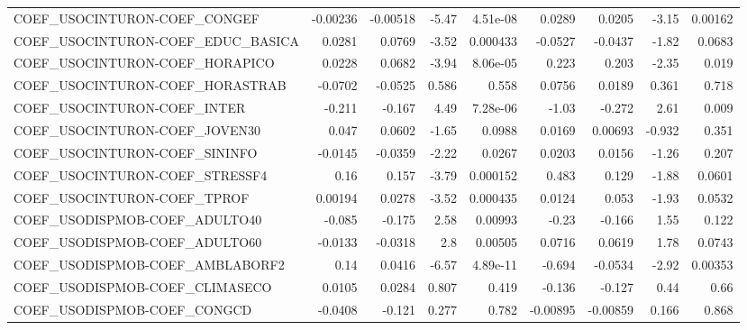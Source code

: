\begin{tabular}{lrrrrrrrr}
COEF\_USOCINTURON-COEF\_CONGEF          &    -0.00236 &     -0.00518 &    -5.47 & 4.51e-08 &     0.0289 &      0.0205 &        -3.15 &       0.00162 \\
COEF\_USOCINTURON-COEF\_EDUC\_BASICA     &      0.0281 &       0.0769 &    -3.52 & 0.000433 &    -0.0527 &     -0.0437 &        -1.82 &        0.0683 \\
COEF\_USOCINTURON-COEF\_HORAPICO        &      0.0228 &       0.0682 &    -3.94 & 8.06e-05 &      0.223 &       0.203 &        -2.35 &         0.019 \\
COEF\_USOCINTURON-COEF\_HORASTRAB       &     -0.0702 &      -0.0525 &    0.586 &    0.558 &     0.0756 &      0.0189 &        0.361 &         0.718 \\
COEF\_USOCINTURON-COEF\_INTER           &      -0.211 &       -0.167 &     4.49 & 7.28e-06 &      -1.03 &      -0.272 &         2.61 &         0.009 \\
COEF\_USOCINTURON-COEF\_JOVEN30         &       0.047 &       0.0602 &    -1.65 &   0.0988 &     0.0169 &     0.00693 &       -0.932 &         0.351 \\
COEF\_USOCINTURON-COEF\_SININFO         &     -0.0145 &      -0.0359 &    -2.22 &   0.0267 &     0.0203 &      0.0156 &        -1.26 &         0.207 \\
COEF\_USOCINTURON-COEF\_STRESSF4        &        0.16 &        0.157 &    -3.79 & 0.000152 &      0.483 &       0.129 &        -1.88 &        0.0601 \\
COEF\_USOCINTURON-COEF\_TPROF           &     0.00194 &       0.0278 &    -3.52 & 0.000435 &     0.0124 &       0.053 &        -1.93 &        0.0532 \\
COEF\_USODISPMOB-COEF\_ADULTO40         &      -0.085 &       -0.175 &     2.58 &  0.00993 &      -0.23 &      -0.166 &         1.55 &         0.122 \\
COEF\_USODISPMOB-COEF\_ADULTO60         &     -0.0133 &      -0.0318 &      2.8 &  0.00505 &     0.0716 &      0.0619 &         1.78 &        0.0743 \\
COEF\_USODISPMOB-COEF\_AMBLABORF2       &        0.14 &       0.0416 &    -6.57 & 4.89e-11 &     -0.694 &     -0.0534 &        -2.92 &       0.00353 \\
COEF\_USODISPMOB-COEF\_CLIMASECO        &      0.0105 &       0.0284 &    0.807 &    0.419 &     -0.136 &      -0.127 &         0.44 &          0.66 \\
COEF\_USODISPMOB-COEF\_CONGCD           &     -0.0408 &       -0.121 &    0.277 &    0.782 &   -0.00895 &    -0.00859 &        0.166 &         0.868 \\

\end{tabular}
